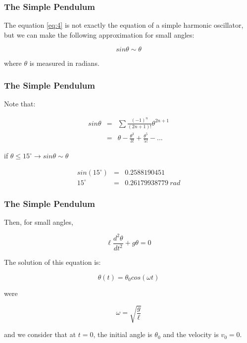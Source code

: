 \documentclass[]{beamer}
\begin{document}

\begin{frame}
\frametitle{The Simple Pendulum}

The equation \ref{eq:4} is not exactly the equation of a simple harmonic oscillator, but we can make the following approximation for small angles:

\begin{equation*}
sin\theta\sim \theta
\end{equation*}

where $\theta$ is measured in radians.


\end{frame}

\begin{frame}
\frametitle{The Simple Pendulum}


Note that:

\begin{eqnarray*}
sin\theta&=&\sum \frac{(-1)^n}{(2n+1)!}\theta^{2n+1}\\
&=&\theta-\frac{\theta^3}{3!}+\frac{ \theta^5}{5!}-...
\end{eqnarray*}
 
if $\theta \leq 15^{\circ}\rightarrow sin\theta\sim \theta$

\begin{eqnarray*}
sin(15^{\circ})&=&0.2588190451\\
15^{\circ}&=&0.26179938779~rad
\end{eqnarray*}

\end{frame}


\begin{frame}
\frametitle{The Simple Pendulum}

Then, for small angles,
\pause

\begin{equation}
\ell \frac{d^2\theta}{dt^2}+g\theta=0
\label{eq:5}
\end{equation}
\pause

The solution of this equation is:
\pause

\begin{equation}
\theta (t)=\theta_0cos(\omega t)
\label{eq:6}
\end{equation}
\pause

were 
\pause

\begin{equation}
\omega=\sqrt{\frac{g}{\ell}}
\label{eq:6}
\end{equation}
\pause

and  we consider that at $t=0$, the initial angle is $\theta_0$ and the velocity is $v_0=0$.

\end{frame}
\end{document}

